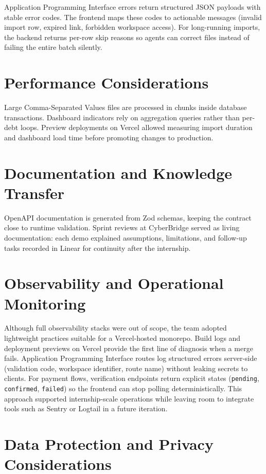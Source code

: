 \documentclass[12pt,a4paper]{report}
\begin{document}
Application Programming Interface errors return structured JSON payloads with stable error codes.
The frontend maps these codes to actionable messages (invalid import row, expired link,
forbidden workspace access).
For long-running imports, the backend returns per-row skip reasons so agents can correct files
instead of failing the entire batch silently.

\section{Performance Considerations}

Large Comma-Separated Values files are processed in chunks inside database transactions.
Dashboard indicators rely on aggregation queries rather than per-debt loops.
Preview deployments on Vercel allowed measuring import duration and dashboard load time before
promoting changes to production.

\section{Documentation and Knowledge Transfer}

OpenAPI documentation is generated from Zod schemas, keeping the contract close to runtime
validation.
Sprint reviews at CyberBridge served as living documentation: each demo explained assumptions,
limitations, and follow-up tasks recorded in Linear for continuity after the internship.

\section{Observability and Operational Monitoring}

Although full observability stacks were out of scope, the team adopted lightweight practices
suitable for a Vercel-hosted monorepo.
Build logs and deployment previews on Vercel provide the first line of diagnosis when a merge
fails.
Application Programming Interface routes log structured errors server-side (validation code,
workspace identifier, route name) without leaking secrets to clients.
For payment flows, verification endpoints return explicit states (\texttt{pending},
\texttt{confirmed}, \texttt{failed}) so the frontend can stop polling deterministically.
This approach supported internship-scale operations while leaving room to integrate tools such as
Sentry or Logtail in a future iteration.

\section{Data Protection and Privacy Considerations}
\end{document}

